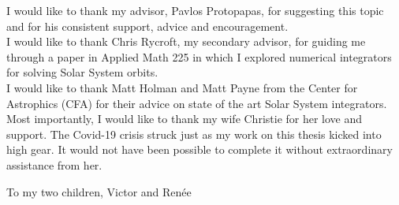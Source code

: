 \documentclass[11pt]{gsasthesis} %
\begin{document}
\renewcommand{\contentsname}{\protect\centering\protect\Large Contents}
\renewcommand{\listtablename}{\protect\centering\protect\Large List of Tables}
\renewcommand{\listfigurename}{\protect\centering\protect\Large List of Figures}

\tableofcontents 

\listoftables
\listoffigures

\begin{acknowledgments}
I would like to thank my advisor, Pavlos Protopapas, for suggesting this topic and for his consistent support, advice and encouragement. \\
I would like to thank Chris Rycroft, my secondary advisor, for guiding me through a paper in Applied Math 225 in which I explored
numerical integrators for solving Solar System orbits.\\
I would like to thank Matt Holman and Matt Payne from the Center for Astrophics (CFA) 
for their advice on state of the art Solar System integrators.\\
Most importantly, I would like to thank my wife Christie for her love and support.
The Covid-19 crisis struck just as my work on this thesis kicked into high gear.
It would not have been possible to complete it without extraordinary assistance from her.
\end{acknowledgments}

\begin{dedication}
To my two children, Victor and Ren\'ee 
\end{dedication}



% 
\end{document}
